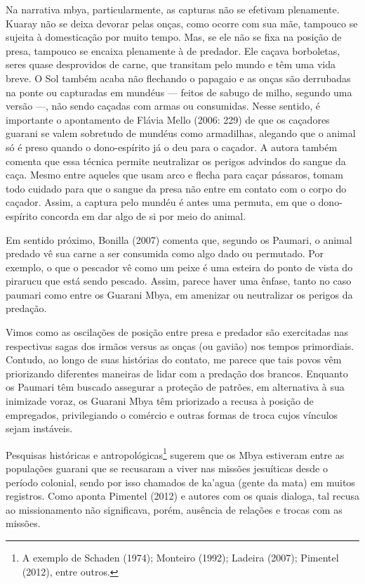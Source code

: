 \documentclass{article}
\begin{document}
Na narrativa mbya, particularmente, as capturas n\~ao se efetivam
plenamente. Kuaray n\~ao se deixa devorar pelas on\c{c}as, como ocorre
com sua m\~ae, tampouco se sujeita \`a domestica\c{c}\~ao por muito
tempo. Mas, se ele n\~ao se fixa na posi\c{c}\~ao de presa, tampouco se
encaixa plenamente \`a de predador. Ele ca\c{c}ava borboletas, seres
quase desprovidos de carne, que transitam pelo mundo e t\^em uma vida
breve. O Sol tamb\'em acaba n\~ao flechando o papagaio e as on\c{c}as
s\~ao derrubadas na ponte ou capturadas em mund\'eus --- feitos de
sabugo de milho, segundo uma vers\~ao ---, n\~ao sendo ca\c{c}adas com
armas ou consumidas. Nesse sentido, \'e importante o apontamento de
Fl\'avia Mello (2006: 229) de que os ca\c{c}adores guarani se valem
sobretudo de mund\'eus como armadilhas, alegando que o animal s\'o \'e
preso quando o dono-esp\'irito j\'a o deu para o ca\c{c}ador. A autora
tamb\'em comenta que essa t\'ecnica permite neutralizar os perigos
advindos do sangue da ca\c{c}a. Mesmo entre aqueles que usam arco e
flecha para ca\c{c}ar p\'assaros, tomam todo cuidado para que o sangue
da presa n\~ao entre em contato com o corpo do ca\c{c}ador. Assim, a
captura pelo mund\'eu \'e antes uma permuta, em que o dono-esp\'irito
concorda em dar algo de si por meio do animal.

Em sentido pr\'oximo, Bonilla (2007) comenta que, segundo os Paumari, o
animal predado v\^e sua carne a ser consumida como algo dado ou
permutado. Por exemplo, o que o pescador v\^e como um peixe \'e uma
esteira do ponto de vista do pirarucu que est\'a sendo pescado. Assim,
parece haver uma \^enfase, tanto no caso paumari como entre os Guarani
Mbya, em amenizar ou neutralizar os perigos da preda\c{c}\~ao. 

Vimos como as oscila\c{c}\~oes de posi\c{c}\~ao entre presa e predador
s\~ao exercitadas nas respectivas sagas dos irm\~aos versus as
on\c{c}as (ou gavi\~ao) nos tempos primordiais. Contudo, ao longo de
suas hist\'orias do contato, me parece que tais povos v\^em priorizando
diferentes maneiras de lidar com a preda\c{c}\~ao dos brancos. Enquanto
os Paumari t\^em buscado assegurar a prote\c{c}\~ao de patr\~oes, em
alternativa \`a sua inimizade voraz, os Guarani Mbya t\^em priorizado a
recusa \`a posi\c{c}\~ao de empregados, privilegiando o com\'ercio e
outras formas de troca cujos v\'inculos sejam inst\'aveis.

Pesquisas hist\'oricas e antropol\'ogicas\footnote{ A exemplo de Schaden
(1974); Monteiro (1992); Ladeira (2007); Pimentel (2012), entre
outros.} sugerem que os Mbya estiveram entre as popula\c{c}\~oes
guarani que se recusaram a viver nas miss\~oes jesu\'iticas desde o
per\'iodo colonial, sendo por isso chamados de ka{\textquoteright}agua
(gente da mata) em muitos registros. Como aponta Pimentel (2012) e
autores com os quais dialoga, tal recusa ao missionamento n\~ao
significava, por\'em, aus\^encia de rela\c{c}\~oes e trocas com as
miss\~oes.
\end{document}
